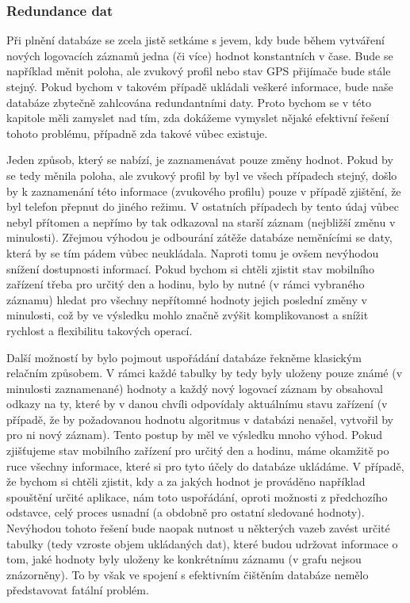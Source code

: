 \documentclass[thesis=M,czech]{FITthesis}[2012/06/26]
\begin{document}
\subsubsection*{Redundance dat}
Při plnění databáze se zcela jistě setkáme s jevem, kdy bude během vytváření nových logovacích záznamů jedna (či více) hodnot konstantních v čase. Bude se například měnit poloha, ale zvukový profil nebo stav GPS přijímače bude stále stejný. Pokud bychom v takovém případě ukládali veškeré informace, bude naše databáze zbytečně zahlcována redundantními daty. Proto bychom se v této kapitole měli zamyslet nad tím, zda dokážeme vymyslet nějaké efektivní řešení tohoto problému, případně zda takové vůbec existuje.

Jeden způsob, který se nabízí, je zaznamenávat pouze změny hodnot. Pokud by se tedy měnila poloha, ale zvukový profil by byl ve všech případech stejný, došlo by k zaznamenání této informace (zvukového profilu) pouze v případě zjištění, že byl telefon přepnut do jiného režimu. V ostatních případech by tento údaj vůbec nebyl přítomen a nepřímo by tak odkazoval na starší záznam (nejbližší změnu v minulosti). Zřejmou výhodou je odbourání zátěže databáze neměnícími se daty, která by se tím pádem vůbec neukládala. Naproti tomu je ovšem nevýhodou snížení dostupnosti informací. Pokud bychom si chtěli zjistit stav mobilního zařízení třeba pro určitý den a hodinu, bylo by nutné (v rámci vybraného záznamu) hledat pro všechny nepřítomné hodnoty jejich poslední změny v minulosti, což by ve výsledku mohlo značně zvýšit komplikovanost a snížit rychlost a flexibilitu takových operací.

Další možností by bylo pojmout uspořádání databáze řekněme klasickým relačním způsobem. V rámci každé tabulky by tedy byly uloženy pouze známé (v minulosti zaznamenané) hodnoty a každý nový logovací záznam by obsahoval odkazy na ty, které by v danou chvíli odpovídaly aktuálnímu stavu zařízení (v případě, že by požadovanou hodnotu algoritmus v databázi nenašel, vytvořil by pro ni nový záznam). Tento postup by měl ve výsledku mnoho výhod. Pokud zjišťujeme stav mobilního zařízení pro určitý den a hodinu, máme okamžitě po ruce všechny informace, které si pro tyto účely do databáze ukládáme. V případě, že bychom si chtěli zjistit, kdy a za jakých hodnot je prováděno například spouštění určité aplikace, nám toto uspořádání, oproti možnosti z předchozího odstavce, celý proces usnadní (a obdobně pro ostatní sledované hodnoty). Nevýhodou tohoto řešení bude naopak nutnost u některých vazeb zavést určité  tabulky (tedy vzroste objem ukládaných dat), které budou udržovat informace o tom, jaké hodnoty byly uloženy ke konkrétnímu záznamu (v grafu nejsou znázorněny). To by však ve spojení s efektivním čištěním databáze nemělo představovat fatální problém.
\end{document}
